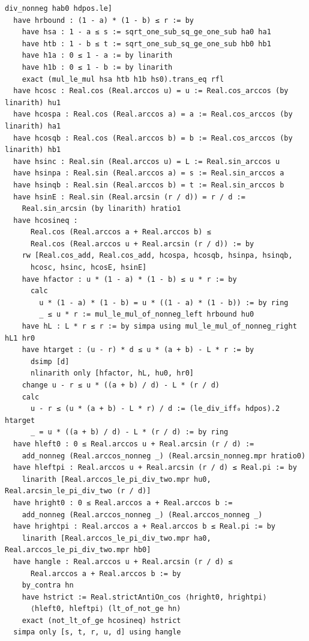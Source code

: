 \documentclass[11pt,a4paper]{article}
\begin{document}
\begin{Verbatim}[breaklines,breakanywhere,fontsize=\footnotesize]
      div_nonneg hab0 hdpos.le]
  have hrbound : (1 - a) * (1 - b) ≤ r := by
    have hsa : 1 - a ≤ s := sqrt_one_sub_sq_ge_one_sub ha0 ha1
    have htb : 1 - b ≤ t := sqrt_one_sub_sq_ge_one_sub hb0 hb1
    have h1a : 0 ≤ 1 - a := by linarith
    have h1b : 0 ≤ 1 - b := by linarith
    exact (mul_le_mul hsa htb h1b hs0).trans_eq rfl
  have hcosc : Real.cos (Real.arccos u) = u := Real.cos_arccos (by linarith) hu1
  have hcospa : Real.cos (Real.arccos a) = a := Real.cos_arccos (by linarith) ha1
  have hcosqb : Real.cos (Real.arccos b) = b := Real.cos_arccos (by linarith) hb1
  have hsinc : Real.sin (Real.arccos u) = L := Real.sin_arccos u
  have hsinpa : Real.sin (Real.arccos a) = s := Real.sin_arccos a
  have hsinqb : Real.sin (Real.arccos b) = t := Real.sin_arccos b
  have hsinE : Real.sin (Real.arcsin (r / d)) = r / d :=
    Real.sin_arcsin (by linarith) hratio1
  have hcosineq :
      Real.cos (Real.arccos a + Real.arccos b) ≤
      Real.cos (Real.arccos u + Real.arcsin (r / d)) := by
    rw [Real.cos_add, Real.cos_add, hcospa, hcosqb, hsinpa, hsinqb,
      hcosc, hsinc, hcosE, hsinE]
    have hfactor : u * (1 - a) * (1 - b) ≤ u * r := by
      calc
        u * (1 - a) * (1 - b) = u * ((1 - a) * (1 - b)) := by ring
        _ ≤ u * r := mul_le_mul_of_nonneg_left hrbound hu0
    have hL : L * r ≤ r := by simpa using mul_le_mul_of_nonneg_right hL1 hr0
    have htarget : (u - r) * d ≤ u * (a + b) - L * r := by
      dsimp [d]
      nlinarith only [hfactor, hL, hu0, hr0]
    change u - r ≤ u * ((a + b) / d) - L * (r / d)
    calc
      u - r ≤ (u * (a + b) - L * r) / d := (le_div_iff₀ hdpos).2 htarget
      _ = u * ((a + b) / d) - L * (r / d) := by ring
  have hleft0 : 0 ≤ Real.arccos u + Real.arcsin (r / d) :=
    add_nonneg (Real.arccos_nonneg _) (Real.arcsin_nonneg.mpr hratio0)
  have hleftpi : Real.arccos u + Real.arcsin (r / d) ≤ Real.pi := by
    linarith [Real.arccos_le_pi_div_two.mpr hu0, Real.arcsin_le_pi_div_two (r / d)]
  have hright0 : 0 ≤ Real.arccos a + Real.arccos b :=
    add_nonneg (Real.arccos_nonneg _) (Real.arccos_nonneg _)
  have hrightpi : Real.arccos a + Real.arccos b ≤ Real.pi := by
    linarith [Real.arccos_le_pi_div_two.mpr ha0, Real.arccos_le_pi_div_two.mpr hb0]
  have hangle : Real.arccos u + Real.arcsin (r / d) ≤
      Real.arccos a + Real.arccos b := by
    by_contra hn
    have hstrict := Real.strictAntiOn_cos ⟨hright0, hrightpi⟩
      ⟨hleft0, hleftpi⟩ (lt_of_not_ge hn)
    exact (not_lt_of_ge hcosineq) hstrict
  simpa only [s, t, r, u, d] using hangle


\end{Verbatim}
\end{document}
